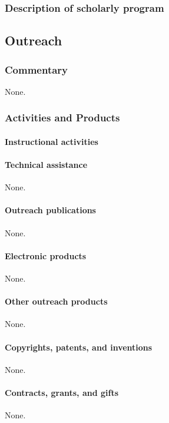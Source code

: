 \subsubsection{Description of scholarly program}


\subsection{Outreach}

\subsubsection{Commentary}
None.

\subsubsection{Activities and Products}

\paragraph{Instructional activities}


\paragraph{Technical assistance}
None.

\paragraph{Outreach publications}
None.

\paragraph{Electronic products}
None.

\paragraph{Other outreach products}
None.

\paragraph{Copyrights, patents, and inventions}
None.

\paragraph{Contracts, grants, and gifts}
None.

